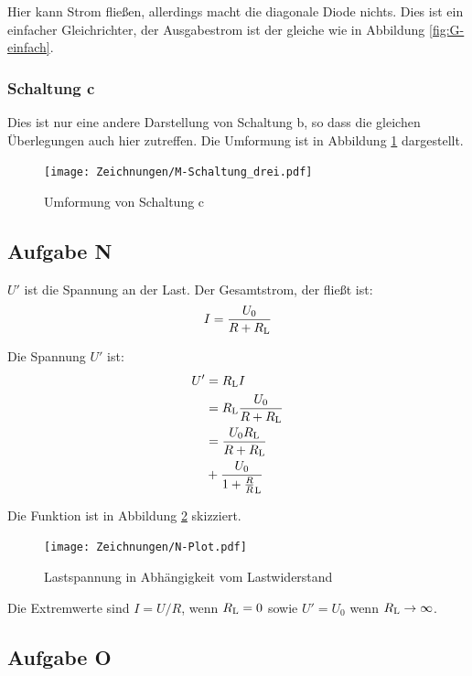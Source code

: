 Hier kann Strom fließen, allerdings macht die diagonale Diode nichts. Dies ist
ein einfacher Gleichrichter, der Ausgabestrom ist der gleiche wie in Abbildung
\ref{fig:G-einfach}.

\subsubsection{Schaltung c}

Dies ist nur eine andere Darstellung von Schaltung b, so dass die gleichen
Überlegungen auch hier zutreffen. Die Umformung ist in Abbildung
\ref{fig:M-Schaltung_drei} dargestellt.

\begin{figure}[h]
	\centering
	\caption{%
		Umformung von Schaltung c
	}
	\label{fig:M-Schaltung_drei}
	\texttt{[image: Zeichnungen/M-Schaltung\_drei.pdf]}
\end{figure}

\subsection{Aufgabe N}

$U'$ ist die Spannung an der Last. Der Gesamtstrom, der fließt ist:
\[
	I = \frac{U_0}{R + R_\text L}
\]

\newcommand\RL{R_\text L}

Die Spannung $U'$ ist:
\begin{align*}
	U'
	&= \RL I \\
	&= \RL \frac{U_0}{R + R_\text L} \\
	&= \frac{U_0 \RL}{R + \RL} \\
	&+ \frac{U_0}{1 + \frac R\RL}
\end{align*}

Die Funktion ist in Abbildung \ref{fig:N-Plot} skizziert.

\begin{figure}[h]
	\centering
	\caption{%
		Lastspannung in Abhängigkeit vom Lastwiderstand
	}
	\label{fig:N-Plot}
	\texttt{[image: Zeichnungen/N-Plot.pdf]}
\end{figure}

Die Extremwerte sind $I = U/R$, wenn $\RL = 0$ sowie $U' = U_0$ wenn $\RL \to
\infty$.

\subsection{Aufgabe O}

\newcommand\IZmax{I_\text{Z,max}}
\newcommand\IZmin{I_\text{Z,min}}
\newcommand\IZ{I_\text Z}
\newcommand\UZ{U_\text Z}

